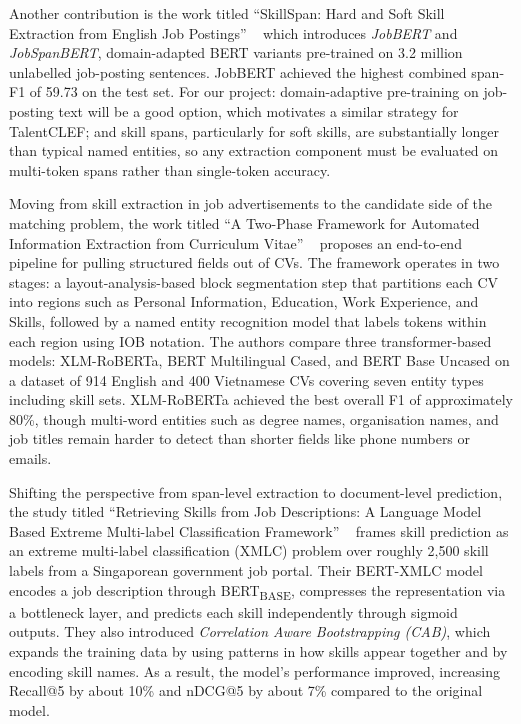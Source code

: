\documentclass[]{ceurart}
\begin{document}
Another contribution is the work titled ``SkillSpan: Hard and Soft Skill
Extraction from English Job Postings'' ~\cite{Zhang2022} which introduces 
\textit{JobBERT} and \textit{JobSpanBERT},
domain-adapted BERT variants pre-trained on 3.2 million unlabelled job-posting
sentences. JobBERT achieved the highest combined span-F1 of 59.73 on the test set. 
For our project: domain-adaptive 
pre-training on job-posting text will be a good option, which
motivates a similar strategy for TalentCLEF; and skill spans, particularly for soft
skills, are substantially longer than typical named entities, so any extraction
component must be evaluated on multi-token spans rather than single-token accuracy.

Moving from skill extraction in job advertisements to the candidate side of the
matching problem, the work titled ``A Two-Phase Framework for Automated Information
Extraction from Curriculum Vitae'' ~\cite{Ngo2020CVExtraction} proposes
an end-to-end pipeline for pulling structured fields out of CVs. The framework
operates in two stages: a layout-analysis-based block segmentation step that partitions
each CV into regions such as Personal Information, Education, Work Experience, and
Skills, followed by a named entity recognition model that labels tokens within each
region using IOB notation. The authors compare three
transformer-based models: XLM-RoBERTa, BERT Multilingual Cased, and BERT Base
Uncased on a dataset of 914 English and 400 Vietnamese CVs covering
seven entity types including skill sets. XLM-RoBERTa achieved the best overall F1 of
approximately 80\%, though multi-word entities such as degree
names, organisation names, and job titles remain harder to detect than shorter fields
like phone numbers or emails.

Shifting the perspective from span-level extraction to document-level prediction, the
study titled ``Retrieving Skills from Job Descriptions: A Language Model Based Extreme
Multi-label Classification Framework'' ~\cite{Bhola2020XMLC} frames
skill prediction as an extreme multi-label classification (XMLC) problem over roughly
2,500 skill labels from a Singaporean government job portal. Their BERT-XMLC model
encodes a job description through BERT\textsubscript{BASE}, compresses the
representation via a bottleneck layer, and predicts each skill independently through
sigmoid outputs. They also introduced \textit{Correlation Aware Bootstrapping (CAB)}, 
which expands the training data by using patterns in how skills appear together 
and by encoding skill names. As a result, the model’s performance improved, increasing 
Recall@5 by about 10\% and nDCG@5 by about 7\% compared to the original model. 
\end{document}
